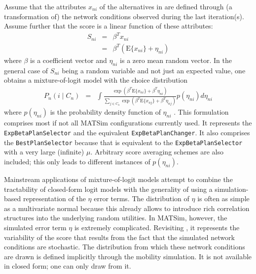 Assume that the attributes $x_{ni}$ of the alternatives in 
are defined through (a transformation of) the network conditions observed
during the last iteration(s). Assume further that the score is a linear
function of these attributes:
\begin{eqnarray}
S_{ni} & = & \beta^{T}x_{ni}\\
 & = & \beta^{T}(\text{E}\{x_{ni}\}+\eta_{ni})\label{eq:score}
\end{eqnarray}
where $\beta$ is a coefficient vector and $\eta_{ni}$ is a zero
mean random vector. In the general case of $S_{ni}$ being a random
variable and not just an expected value, one obtains a mixture-of-logit
model with the choice distribution
\begin{eqnarray}
P_{n}(i\mid C_{n}) & = & \int\frac{\exp\left(\beta^{T}\text{E}\{x_{ni}\}+\beta^{T}\eta_{ni}\right)}{\sum_{j\in C_{n}}\exp\left(\beta^{T}\text{E}\{x_{nj}\}+\beta^{T}\eta_{nj}\right)}p(\eta_{ni})d\eta_{ni}\label{eq:mixture-of-logit}
\end{eqnarray}
where $p(\eta_{ni})$ is the probability density function of $\eta_{ni}$
\citep{train-2003}. This formulation comprises most if not all MATSim
configurations currently used. It represents the \texttt{ExpBetaPlanSelector}
and the equivalent \texttt{ExpBetaPlanChanger}. It also comprises
the \texttt{BestPlanSelector} because that is equivalent to the \texttt{ExpBetaPlanSelector}
with a very large (infinite) $\mu$. Arbitrary score averaging schemes
are also included; this only leads to different instances of $p(\eta_{ni})$.

Mainstream applications of mixture-of-logit models attempt to combine
the tractability of closed-form logit models with the generality of
using a simulation-based representation of the $\eta$ error terms.
The distribution of $\eta$ is often as simple as a multivariate normal
because this already allows to introduce rich correlation structures
into the underlying random utilities. In MATSim, however, the simulated
error term $\eta$ is extremely complicated. Revisiting ,
it represents the variability of the score that results from the fact
that the simulated network conditions are stochastic. The distribution
from which these network conditions are drawn is defined implicitly
through the mobility simulation. It is not available in closed form;
one can only draw from it.

